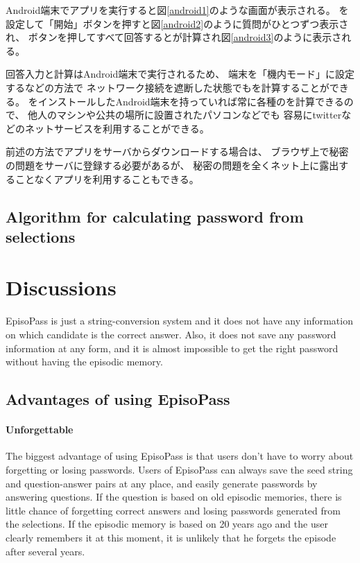 \documentclass{article}
\begin{document}
Android端末でアプリを実行すると図\ref{android1}のような画面が表示される。
{\SS}を設定して「開始」ボタンを押すと図\ref{android2}のように質問がひとつずつ表示され、
ボタンを押してすべて回答すると{\PW}が計算され図\ref{android3}のように表示される。

回答入力と{\PW}計算はAndroid端末で実行されるため、
端末を「機内モード」に設定するなどの方法で
ネットワーク接続を遮断した状態でも{\PW}を計算することができる。
{\EP}をインストールしたAndroid端末を持っていれば常に各種の{\PW}を計算できるので、
他人のマシンや公共の場所に設置されたパソコンなどでも
容易にtwitterなどのネットサービスを利用することができる。

前述の方法で{\EP}アプリをサーバからダウンロードする場合は、
ブラウザ上で秘密の問題をサーバに登録する必要があるが、
秘密の問題を全くネット上に露出することなくアプリを利用することもできる。

\subsection{Algorithm for calculating password from selections}



\section{Discussions}

EpisoPass is just a string-conversion system and it does not
have any information on which candidate is the correct answer.
Also, it does not save any password information at any form, and
it is almost impossible to get the right password 
without having the episodic memory.

\subsection{Advantages of using EpisoPass}

\paragraph{Unforgettable}


The biggest advantage of using EpisoPass is that
users don't have to worry about forgetting or losing passwords.
Users of EpisoPass can always save the seed string and question-answer
pairs at any place, and easily generate passwords by answering questions.
If the question is based on old episodic memories,
there is little chance of forgetting correct answers and losing passwords
generated from the selections.
If the episodic memory is based on 20 years ago and the user clearly
remembers it at this moment, it is unlikely that he forgets the episode after
several years.
\end{document}
